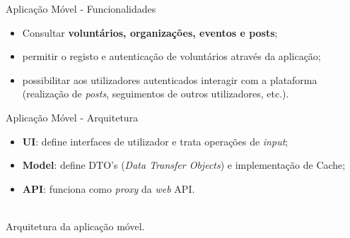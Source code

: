 \begin{frame}{Aplicação Móvel - Funcionalidades}

\vspace*{-3em}

\begin{itemize}
	\item Consultar \textbf{voluntários, organizações, eventos e posts};
	\item permitir o registo e autenticação de voluntários através da aplicação;
	\item possibilitar aos utilizadores autenticados interagir com a plataforma (realização de \textit{posts}, seguimentos de outros utilizadores, etc.).
\end{itemize}

\end{frame}

\begin{frame}{Aplicação Móvel - Arquitetura}
	
\vspace*{-4em}
	
\begin{itemize}
	\item \textbf{UI}: define interfaces de utilizador e trata operações de \textit{input};
	\item \textbf{Model}: define DTO's (\textit{Data Transfer Objects}) e implementação de Cache;
	\item \textbf{API}: funciona como \textit{proxy} da \textit{web} API.
\end{itemize}	

\centering
{}\\

{\small Arquitetura da aplicação móvel.}

\end{frame}